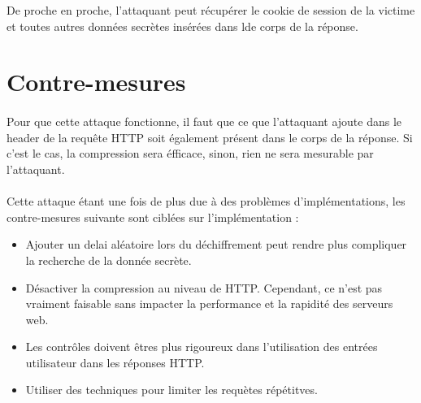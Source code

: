 De proche en proche, l'attaquant peut récupérer le cookie de session de la victime et toutes autres données secrètes insérées dans lde corps de la réponse.

\section{Contre-mesures}
\paragraph{}
Pour que cette attaque fonctionne, il faut que ce que l'attaquant ajoute dans le header de la requête HTTP soit également présent dans le corps de la réponse. Si c'est le cas, la compression sera éfficace, sinon, rien ne sera mesurable par l'attaquant.

\paragraph{}
Cette attaque étant une fois de plus due à des problèmes d'implémentations, les contre-mesures suivante sont ciblées sur l'implémentation :
\begin{itemize}
  \item Ajouter un delai aléatoire lors du déchiffrement peut rendre plus compliquer la recherche de la donnée secrète.
  \item Désactiver la compression au niveau de HTTP. Cependant, ce n'est pas vraiment faisable sans impacter la performance et la rapidité des serveurs web.
  \item Les contrôles doivent êtres plus rigoureux dans l'utilisation des entrées utilisateur dans les réponses HTTP.
  \item Utiliser des techniques pour limiter les requètes répétitves.
\end{itemize}

